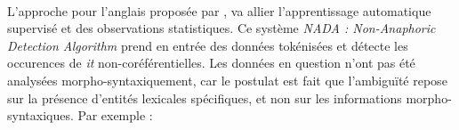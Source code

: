 \documentclass[a4paper,12pt]{article}
\begin{document}
%
%


\paragraph{}
L'approche pour l'anglais proposée par \citet{Bergsma-11}, va allier l'apprentissage automatique supervisé et des observations statistiques.
Ce système \textit{NADA : Non-Anaphoric Detection Algorithm} prend en entrée des données tokénisées et détecte les occurences de \og{}\textit{it}\fg{} non-coréférentielles. Les données en question n'ont pas été analysées morpho-syntaxiquement, car le postulat est fait que l'ambiguïté repose sur la présence d'entités lexicales spécifiques, et non sur les informations morpho-syntaxiques.
Par exemple :
\end{document}
